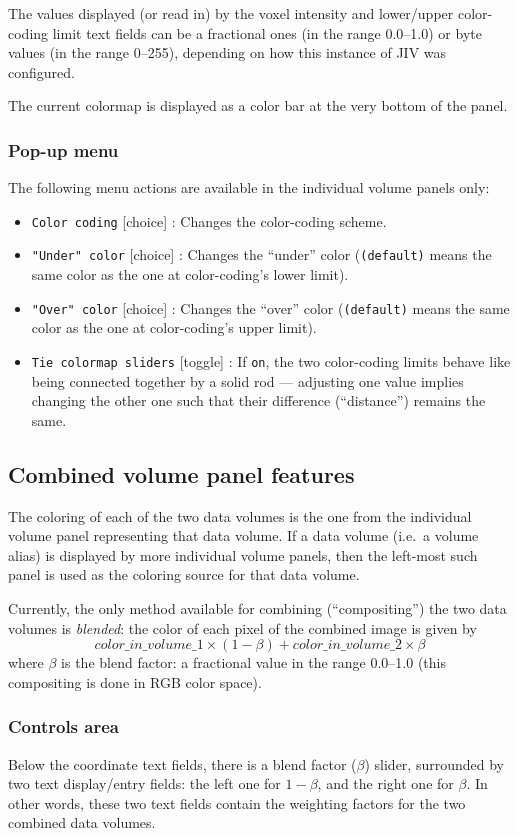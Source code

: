 The values displayed (or read in) by the voxel intensity and
lower/upper color-coding limit text fields can be a fractional ones
(in the range 0.0--1.0) or byte values (in the range 0--255),
depending on how this instance of JIV was configured.

The current colormap is displayed as a color bar at the very bottom of
the panel.

\subsubsection{Pop-up menu}
The following menu actions are available in the individual volume
panels only:
\begin{itemize}
\item \verb+Color coding+ [choice] : Changes the color-coding scheme.
\item \verb+"Under" color+ [choice] : Changes the ``under'' color
  (\verb+(default)+ means the same color as the one at color-coding's
  lower limit).
\item \verb+"Over" color+ [choice] : Changes the ``over'' color
  (\verb+(default)+ means the same color as the one at color-coding's
  upper limit).
\item \verb+Tie colormap sliders+ [toggle] : If \verb+on+, the two
  color-coding limits behave like being connected together by a solid
  rod --- adjusting one value implies changing the other one such that
  their difference (``distance'') remains the same.
\end{itemize}

\subsection{Combined volume panel features}
\label{sec:combined-panel-features}
The coloring of each of the two data volumes is the one from the
individual volume panel representing that data volume. If a data
volume (i.e.\ a volume alias) is displayed by more individual volume
panels, then the left-most such panel is used as the coloring source
for that data volume.

Currently, the only method available for combining (``compositing'')
the two data volumes is {\em blended}: the color of each pixel of
the combined image is given by
\[ color\_in\_volume\_1 \times ( 1 - \beta ) + 
color\_in\_volume\_2 \times \beta \] where $\beta$ is the blend
factor: a fractional value in the range 0.0--1.0 (this compositing is
done in RGB color space).

\subsubsection{Controls area}
Below the coordinate text fields, there is a blend factor ($\beta$)
slider, surrounded by two text display/entry fields: the left one for
$1 - \beta$, and the right one for $\beta$.  In other words, these two
text fields contain the weighting factors for the two combined data
volumes.


